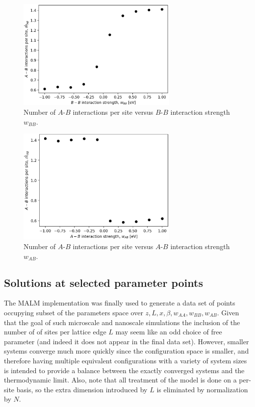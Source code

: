 \documentclass[10pt]{article}
\begin{document}
\begin{figure}[h!]
\centering
\includegraphics[width=0.70\textwidth]{Figures/m_AB_hat_versus_w_BB.png}
\caption{Number of $A$-$B$ interactions per site versus $B$-$B$ interaction strength $w_{BB}$.}
\label{fig:m_AB_hat_versus_w_BB}
\end{figure}

\begin{figure}[h!]
\centering
\includegraphics[width=0.70\textwidth]{Figures/m_AB_hat_versus_w_AB.png}
\caption{Number of $A$-$B$ interactions per site versus $A$-$B$ interaction strength $w_{AB}$.}
\label{fig:m_AB_hat_versus_w_AB}
\end{figure}

\subsection{Solutions at selected parameter points}
The MALM implementation was finally used to generate a data set of points occupying subset of the parameters space over $z,L,x,\beta,w_{AA},w_{BB},w_{AB}$.
Given that the goal of such microscale and nanoscale simulations the inclusion of the number of of sites per lattice edge $L$ may seem like an odd choice of free parameter (and indeed it does not appear in the final data set).
However, smaller systems converge much more quickly since the configuration space is smaller, and therefore having multiple equivalent configurations with a variety of system sizes is intended to provide a balance between the exactly converged systems and the thermodynamic limit.
Also, note that all treatment of the model is done on a per-site basis, so the extra dimension introduced by $L$ is eliminated by normalization by $N$.
\end{document}
